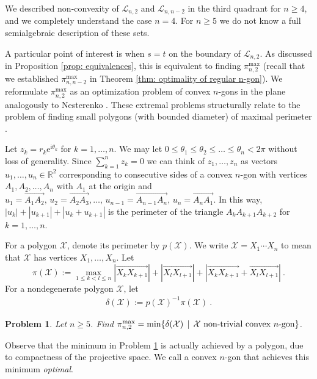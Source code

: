 \documentclass[reqno,hidelinks,11pt]{amsart}
\numberwithin{equation}{section}
\newtheorem{problem}[theorem]{Problem}
\def\RR{\mathbb{R}}
\def\d{\delta}
\def\X{\mathcal{X}}
\newcommand{\suchthat}{\;\ifnum\currentgrouptype=16 \middle\fi|\;}
\begin{document}
We described non-convexity of $\mathcal{L}_{n, 2}$ and $\mathcal{L}_{n,n- 2}$ in the third quadrant for $n \geq 4$, and we completely understand the case $n=4$. For $n \geq 5$ we do not know a full semialgebraic description of these sets. 

A particular point of interest is when $s = t$ on the boundary of $\mathcal{L}_{n, 2}$. As discussed in Proposition \ref{prop: equivalences}, this is equivalent to finding $\pi_{n, 2}^{\max}$ (recall that we established $\pi_{n,n-2}^{\max}$ in Theorem \ref{thm: optimality of regular n-gon}).
We reformulate $\pi_{n, 2}^{\max}$ as an optimization problem of convex $n$-gons in the plane analogously to Nesterenko \cite{nesterenko2024submatrices}.
These extremal problems structurally relate to the problem of finding small polygons (with bounded diameter) of maximal perimeter \cite{Henrion13,Bingane24,Mulansky2025}.  

Let $z_k=r_k\mathrm{e}^{\mathrm{i}\theta_k}$ for $k=1,\dots,n$. We may let $0\le\theta_1\le\theta_2\le\dots\le\theta_n<2\pi$ without loss of generality. Since $\sum_{k=1}^n z_k=0$ we can think of $z_1,\dots,z_n$ as vectors $u_1,\dots,u_n\in\RR^2$ corresponding to consecutive sides of a convex $n$-gon with vertices $A_1,A_2,\dots, A_n$ with $A_1$ at the origin and $u_1=\overrightarrow{A_1A_2},\, u_2=\overrightarrow{A_2A_3},\dots,\, u_{n-1}=\overrightarrow{A_{n-1}A_n},\, u_n=\overrightarrow{A_nA_1}$. In this way, $|u_k|+|u_{k+1}|+|u_k+u_{k+1}|$ is the perimeter of the triangle $A_kA_{k+1}A_{k+2}$ for $k=1,\dots,n$. 

For a polygon $\X$, denote its perimeter by $p(\X)$. We write $\X=X_1\cdots X_n$ to mean that $\X$ has vertices $X_1,\dots,X_n$. Let 
\[
\pi(\X):= \max_{1\le k<l\le n}|\overrightarrow{X_k X_{k+1}}|+|\overrightarrow{X_l X_{l+1}}|+|\overrightarrow{X_k X_{k+1}}+\overrightarrow{X_l X_{l+1}}|~.
\]
For a nondegenerate polygon $\X$, let
\begin{align*}
    \d(\X):=p(\X)^{-1}\pi(\X)~.
\end{align*}

\begin{problem}\label{problem: polygon}
    Let $n\ge5$. Find $\pi_{n,2}^{\max}=\min\{\d(\X)\,\suchthat\, \X \text{ non-trivial convex } n\text{-gon}\}$.
\end{problem}

Observe that the minimum in Problem \ref{problem: polygon} is actually achieved by a polygon, due to compactness of the projective space. We call a convex  $n$-gon that achieves this minimum \emph{optimal}.
\end{document}
